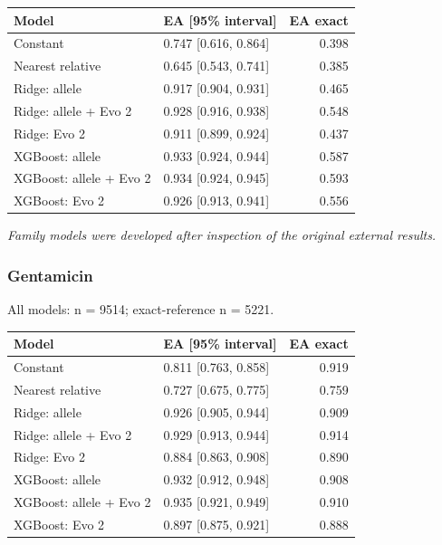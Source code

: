 \documentclass[
  10pt,
]{article}
\newcounter{none} %
\begin{document}
{\def\LTcaptype{none} %
\begin{longtable}[]{@{}llr@{}}
\toprule\noalign{}
Model & EA {[}95\% interval{]} & EA exact \\
\midrule\noalign{}
\endhead
\bottomrule\noalign{}
\endlastfoot
Constant & 0.747 {[}0.616, 0.864{]} & 0.398 \\
Nearest relative & 0.645 {[}0.543, 0.741{]} & 0.385 \\
Ridge: allele & 0.917 {[}0.904, 0.931{]} & 0.465 \\
Ridge: allele + Evo 2 & 0.928 {[}0.916, 0.938{]} & 0.548 \\
Ridge: Evo 2 & 0.911 {[}0.899, 0.924{]} & 0.437 \\
XGBoost: allele & 0.933 {[}0.924, 0.944{]} & 0.587 \\
XGBoost: allele + Evo 2 & 0.934 {[}0.924, 0.945{]} & 0.593 \\
XGBoost: Evo 2 & 0.926 {[}0.913, 0.941{]} & 0.556 \\
\end{longtable}
}

\emph{Family models were developed after inspection of the original
external results.}

\subsubsection{Gentamicin}\label{gentamicin-3}

All models: n = 9514; exact-reference n = 5221.

{\def\LTcaptype{none} %
\begin{longtable}[]{@{}llr@{}}
\toprule\noalign{}
Model & EA {[}95\% interval{]} & EA exact \\
\midrule\noalign{}
\endhead
\bottomrule\noalign{}
\endlastfoot
Constant & 0.811 {[}0.763, 0.858{]} & 0.919 \\
Nearest relative & 0.727 {[}0.675, 0.775{]} & 0.759 \\
Ridge: allele & 0.926 {[}0.905, 0.944{]} & 0.909 \\
Ridge: allele + Evo 2 & 0.929 {[}0.913, 0.944{]} & 0.914 \\
Ridge: Evo 2 & 0.884 {[}0.863, 0.908{]} & 0.890 \\
XGBoost: allele & 0.932 {[}0.912, 0.948{]} & 0.908 \\
XGBoost: allele + Evo 2 & 0.935 {[}0.921, 0.949{]} & 0.910 \\
XGBoost: Evo 2 & 0.897 {[}0.875, 0.921{]} & 0.888 \\
\end{longtable}
}
\end{document}
